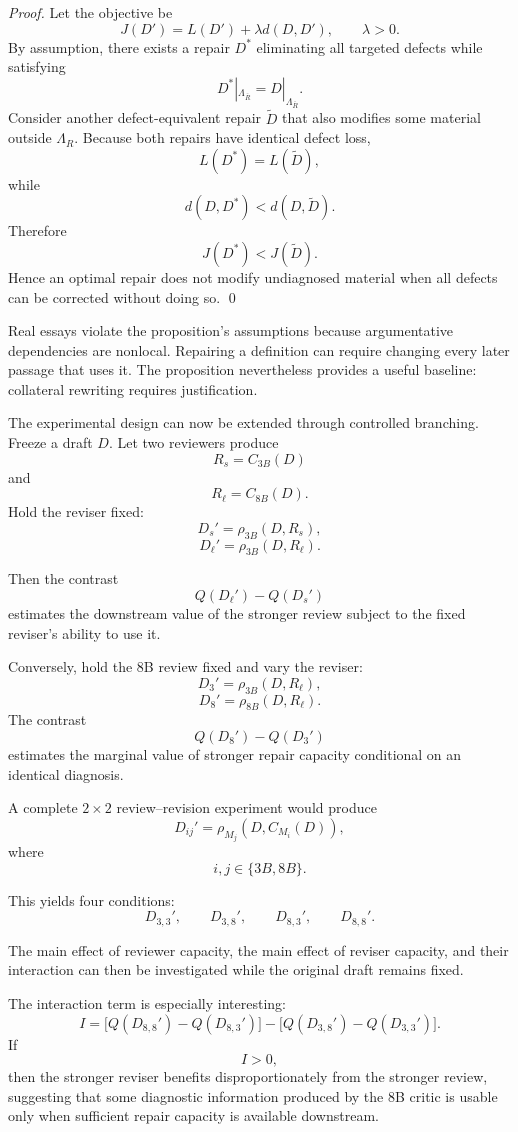 \documentclass[11pt]{article}
\begin{document}
\begin{proof}
Let the objective be
\[
    J(D')
    =
    L(D')
    +
    \lambda d(D,D'),
    \qquad
    \lambda>0.
\]
By assumption, there exists a repair \(D^\ast\) eliminating all targeted defects while satisfying
\[
    D^\ast|_{\Lambda_{\bar R}}
    =
    D|_{\Lambda_{\bar R}}.
\]
Consider another defect-equivalent repair \(\widetilde D\) that also modifies some material outside \(\Lambda_R\). Because both repairs have identical defect loss,
\[
    L(D^\ast)=L(\widetilde D),
\]
while
\[
    d(D,D^\ast)
    <
    d(D,\widetilde D).
\]
Therefore
\[
    J(D^\ast)<J(\widetilde D).
\]
Hence an optimal repair does not modify undiagnosed material when all defects can be corrected without doing so. \qed
\end{proof}

Real essays violate the proposition's assumptions because argumentative dependencies are nonlocal. Repairing a definition can require changing every later passage that uses it. The proposition nevertheless provides a useful baseline: collateral rewriting requires justification.

The experimental design can now be extended through controlled branching. Freeze a draft \(D\). Let two reviewers produce
\[
    R_s=C_{3B}(D)
\]
and
\[
    R_\ell=C_{8B}(D).
\]
Hold the reviser fixed:
\[
    D_s'=\rho_{3B}(D,R_s),
\]
\[
    D_\ell'=\rho_{3B}(D,R_\ell).
\]

Then the contrast
\[
    Q(D_\ell')-Q(D_s')
\]
estimates the downstream value of the stronger review subject to the fixed reviser's ability to use it.

Conversely, hold the 8B review fixed and vary the reviser:
\[
    D_{3}'=\rho_{3B}(D,R_\ell),
\]
\[
    D_{8}'=\rho_{8B}(D,R_\ell).
\]
The contrast
\[
    Q(D_8')-Q(D_3')
\]
estimates the marginal value of stronger repair capacity conditional on an identical diagnosis.

A complete \(2\times2\) review--revision experiment would produce
\[
    D_{ij}'
    =
    \rho_{M_j}
    \left(
        D,
        C_{M_i}(D)
    \right),
\]
where
\[
    i,j\in\{3B,8B\}.
\]

This yields four conditions:
\[
    D_{3,3}',
    \qquad
    D_{3,8}',
    \qquad
    D_{8,3}',
    \qquad
    D_{8,8}'.
\]

The main effect of reviewer capacity, the main effect of reviser capacity, and their interaction can then be investigated while the original draft remains fixed.

The interaction term is especially interesting:
\[
    I
    =
    \bigl[
        Q(D_{8,8}')-Q(D_{8,3}')
    \bigr]
    -
    \bigl[
        Q(D_{3,8}')-Q(D_{3,3}')
    \bigr].
\]
If
\[
    I>0,
\]
then the stronger reviser benefits disproportionately from the stronger review, suggesting that some diagnostic information produced by the 8B critic is usable only when sufficient repair capacity is available downstream.
\end{document}
